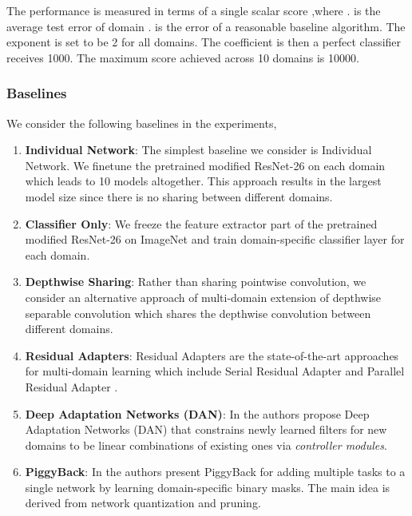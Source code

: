 \documentclass[letterpaper]{article} \usepackage{aaai19}  \usepackage{times}  \usepackage{helvet}  \usepackage{courier}  \usepackage{url}  \usepackage{graphicx}  \usepackage{amssymb}
\begin{document}
The performance is measured in terms of a single scalar score ,where .
 is the average test error of domain .  is the error of a reasonable baseline algorithm. The exponent  is set to be 2 for all domains. The coefficient  is   then a perfect classifier receives 1000. The maximum score achieved across 10 domains is 10000.

\subsubsection{Baselines}
We consider the following baselines in the experiments,
\begin{enumerate}[label=\textbf{(\alph*)}]
\item \textbf{Individual Network}: The simplest baseline we consider is Individual Network. We finetune the pretrained modified ResNet-26 on each domain which leads to 10 models altogether. This approach results in the largest model size since there is no sharing between different domains.

\item \textbf{Classifier Only}: We freeze the feature extractor part of the pretrained modified ResNet-26 on ImageNet and train domain-specific classifier layer for each domain.

\item \textbf{Depthwise Sharing}: Rather than sharing pointwise convolution, we consider an alternative approach of multi-domain extension of depthwise separable convolution which shares the depthwise convolution between different domains. 

\item \textbf{Residual Adapters}: Residual Adapters \cite{rebuffi2017learning,rebuffi18efficient} are the state-of-the-art approaches for multi-domain learning which include Serial Residual Adapter \cite{rebuffi2017learning} and Parallel Residual Adapter \cite{rebuffi18efficient}. 

\item \textbf{Deep Adaptation Networks (DAN)}: In \cite{rosenfeld2017incremental} the authors propose Deep Adaptation Networks (DAN) that constrains newly learned filters for new domains to be linear combinations of existing ones via \textit{controller modules}.

\item \textbf{PiggyBack}: In \cite{mallya2018piggyback} the authors present PiggyBack for adding multiple tasks to a single network by learning domain-specific binary masks. The main idea is derived from network quantization \cite{courbariaux2016binarized,guo2018survey} and pruning. 

\end{enumerate}
\end{document}
